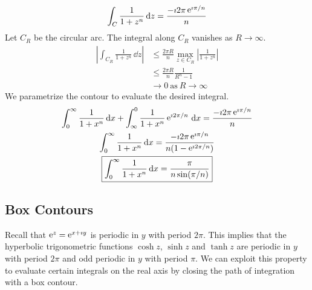 \begin{Example}
  \[
  \int_C \frac{1}{1+z^n} \,\mathrm{d} z = \frac{ -\imath 2 \pi \mathop{\mathrm{e}}\nolimits^{\imath \pi/n} }{ n }
  \]
  Let $C_R$ be the circular arc.  The integral along $C_R$ vanishes as 
  $R \to \infty$.
  \begin{align*}
    \left| \int_{C_R} \frac{1}{1+z^n} \,\dd z \right|
    &\leq \frac{2 \pi R}{n} \max_{z \in C_R} \left| \frac{1}{1+z^n} \right| \\
    &\leq \frac{2 \pi R}{n} \frac{1}{R^n - 1} \\
    &\to 0\ \mathrm{as}\ R \to \infty
  \end{align*}
  We parametrize the contour to evaluate the desired integral.
  \begin{gather*}
    \int_0^\infty \frac{1}{1+x^n} \,\mathrm{d} x 
    + \int_{\infty}^0 \frac{1}{1+x^n} \mathop{\mathrm{e}}\nolimits^{\imath 2 \pi/n} \,\mathrm{d} x
    = \frac{ -\imath 2 \pi \mathop{\mathrm{e}}\nolimits^{\imath \pi/n} }{ n } \\
    \int_0^\infty \frac{1}{1+x^n} \,\mathrm{d} x 
    = \frac{ -\imath 2 \pi \mathop{\mathrm{e}}\nolimits^{\imath \pi/n} }{ n (1 - \mathop{\mathrm{e}}\nolimits^{\imath 2 \pi /n}) } \\
    \boxed{
      \int_0^\infty \frac{1}{1+x^n} \,\mathrm{d} x 
      = \frac{ \pi }{ n \sin( \pi / n ) }
      }
  \end{gather*}
\end{Example}









\subsection{Box Contours}





Recall that $\mathop{\mathrm{e}}\nolimits^z = \mathop{\mathrm{e}}\nolimits^{x + \imath y}$ is periodic in $y$ with period $2 \pi$.
This implies that the hyperbolic trigonometric functions $\cosh z$, 
$\sinh z$ and $\tanh z$ are periodic in $y$ with period $2 \pi$ and 
odd periodic in $y$ with period $\pi$.  We can exploit this property 
to evaluate certain integrals on the real axis by closing the path of 
integration with a box contour.






